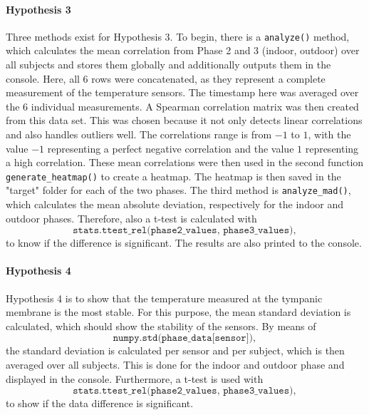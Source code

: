 \paragraph{Hypothesis 3}
Three methods exist for Hypothesis 3.
To begin, there is a \texttt{analyze()} method, which calculates the mean correlation from Phase 2 and 3 (indoor, outdoor) over all subjects and stores them globally and additionally outputs them in the console.
Here, all 6 rows were concatenated, as they represent a complete measurement of the temperature sensors. 
The timestamp here was averaged over the 6 individual measurements.
A Spearman correlation matrix was then created from this data set. 
This was chosen because it not only detects linear correlations and also handles outliers well.
The correlations range is from $-1$ to $1$, with the value $-1$ representing a perfect negative correlation and the value $1$ representing a high correlation.
These mean correlations were then used in the second function \texttt{generate\_heatmap()} to create a heatmap. 
The heatmap is then saved in the "target" folder for each of the two phases.
The third method is \texttt{analyze\_mad()}, which calculates the mean absolute deviation, respectively for the indoor and outdoor phases.
Therefore, also a t-test is calculated with
\[
    \texttt{stats.ttest\_rel(phase2\_values, phase3\_values)},
\]
to know if the difference is significant.
The results are also printed to the console.

\paragraph{Hypothesis 4}
Hypothesis 4 is to show that the temperature measured at the tympanic membrane is the most stable. 
For this purpose, the mean standard deviation is calculated, which should show the stability of the sensors. 
By means of 
\[
    \texttt{numpy.std(phase\_data[sensor])},
\]
the standard deviation is calculated per sensor and per subject, which is then averaged over all subjects.
This is done for the indoor and outdoor phase and displayed in the console.
Furthermore, a t-test is used with
\[
    \texttt{stats.ttest\_rel(phase2\_values, phase3\_values)},
\]
to show if the data difference is significant.

